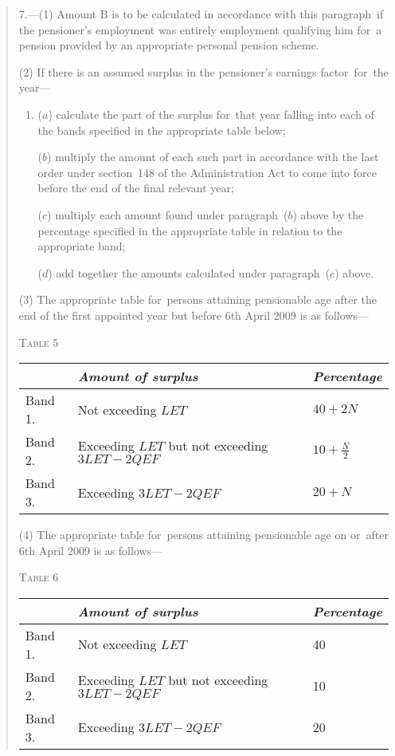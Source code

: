 \documentclass[12pt,a4paper]{article}
\begin{document}
\begin{quotation}
7.---(1) Amount B is to be calculated in accordance with this paragraph~if the pensioner’s employment was entirely employment qualifying him for~a pension provided by an appropriate personal pension scheme.

(2) If there is an assumed surplus in the pensioner’s earnings factor~for~the year—
\begin{enumerate}\item[]
($a$) calculate the part of the surplus for~that year falling into each of the bands specified in the appropriate table below;

($b$) multiply the amount of each such part in accordance with the last order under section~148 of the Administration Act to come into force before the end of the final relevant year;

($c$) multiply each amount found under paragraph~($b$)  above by the percentage specified in the appropriate table in relation to the appropriate band;

($d$) add together the amounts calculated under paragraph~($c$)  above.
\end{enumerate}

(3) The appropriate table for~persons attaining pensionable age after the end of the first appointed year but before 6th April 2009 is as follows—

\pagebreak[3]

\noindent\textsc{Table 5}

{\noindent\footnotesize
\begin{longtable}{lll}
\hline
&\itshape Amount of surplus	&\itshape Percentage\\
\hline
\endhead
\hline
\endlastfoot
Band 1. 	&Not exceeding $LET$	&$40 + 2N$\\
Band 2. 	&Exceeding $LET$ but not exceeding $3LET - 2QEF$	&$10 + \frac{N}{2}$\\
Band 3. 	&Exceeding $3LET - 2QEF$	&$20 + N$\\
\end{longtable}

}

(4) The appropriate table for~persons attaining pensionable age on or~after 6th April 2009 is as follows—

\noindent\textsc{Table 6}

{\noindent\footnotesize
\begin{longtable}{lll}
\hline
&\itshape Amount of surplus	&\itshape Percentage\\
\hline
\endhead
\hline
\endlastfoot
Band 1. 	&Not exceeding $LET$	&40\\
Band 2. 	&Exceeding $LET$ but not exceeding $3LET - 2QEF$	&10\\
Band 3. 	&Exceeding $3LET - 2QEF$	&20\\
\end{longtable}

}
\end{quotation}
\end{document}
